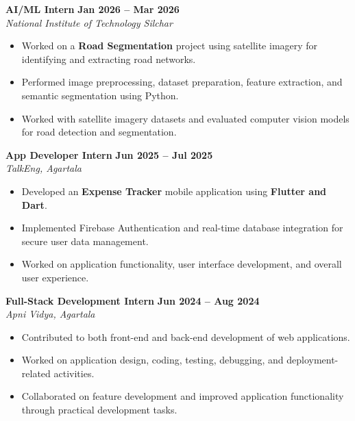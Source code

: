 \documentclass[10pt,a4paper]{article}
\newcommand{\resumeWorkHeading}[3]{
    \textbf{#1}
    \hfill
    \textbf{#3}
    \\
    \textit{#2}
    \vspace{1pt}
}
\begin{document}

\resumeWorkHeading
{AI/ML Intern}
{National Institute of Technology Silchar}
{Jan 2026 -- Mar 2026}

\begin{itemize}[leftmargin=14pt, itemsep=1pt, topsep=1pt]
    \item Worked on a \textbf{Road Segmentation} project using satellite
    imagery for identifying and extracting road networks.
    
    \item Performed image preprocessing, dataset preparation,
    feature extraction, and semantic segmentation using Python.
    
    \item Worked with satellite imagery datasets and evaluated computer
    vision models for road detection and segmentation.
\end{itemize}


\resumeWorkHeading
{App Developer Intern}
{TalkEng, Agartala}
{Jun 2025 -- Jul 2025}

\begin{itemize}[leftmargin=14pt, itemsep=1pt, topsep=1pt]
    \item Developed an \textbf{Expense Tracker} mobile application using
    \textbf{Flutter and Dart}.
    
    \item Implemented Firebase Authentication and real-time database
    integration for secure user data management.
    
    \item Worked on application functionality, user interface development,
    and overall user experience.
\end{itemize}


\resumeWorkHeading
{Full-Stack Development Intern}
{Apni Vidya, Agartala}
{Jun 2024 -- Aug 2024}

\begin{itemize}[leftmargin=14pt, itemsep=1pt, topsep=1pt]
    \item Contributed to both front-end and back-end development of
    web applications.
    
    \item Worked on application design, coding, testing, debugging,
    and deployment-related activities.
    
    \item Collaborated on feature development and improved application
    functionality through practical development tasks.
\end{itemize}
\end{document}
